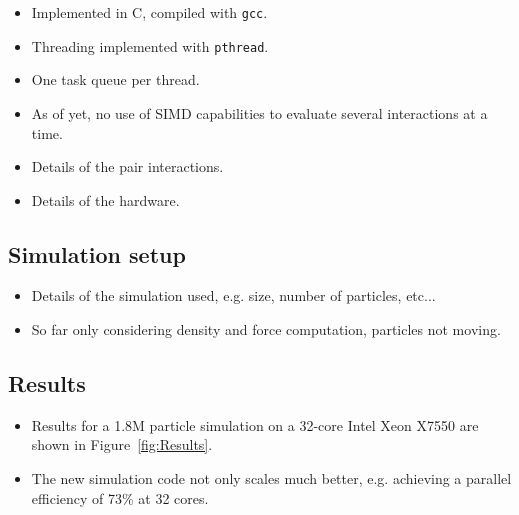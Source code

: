 \documentclass[final]{siamltex}
\newcommand{\fig}[1]
    {Figure~\ref{fig:#1}}
\begin{document}
\begin{itemize}

    \item Implemented in C, compiled with {\tt gcc}.

    \item Threading implemented with {\tt pthread}.

    \item One task queue per thread.
    
    \item As of yet, no use of SIMD capabilities to evaluate several
        interactions at a time.
    
    \item Details of the pair interactions.
    
    \item Details of the hardware.
        
\end{itemize}


\subsection{Simulation setup}

\begin{itemize}

    \item Details of the simulation used, e.g. size, number of particles,
        etc...
        
    \item So far only considering density and force computation,
        particles not moving.
        
\end{itemize}


\subsection{Results}

\begin{itemize}

    \item Results for a 1.8M particle simulation on a 32-core Intel Xeon X7550
        are shown in \fig{Results}.
        
    \item The new simulation code not only scales much better, e.g. achieving
        a parallel efficiency of 73\% at 32 cores.

\end{itemize}
\end{document}
